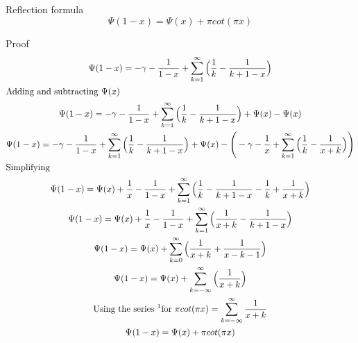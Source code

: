 \documentclass[a4paper]{article}
\begin{document}
    \begin{theorem}
        Reflection formula
        \begin{equation}
            \Psi(1-x) = \Psi(x) + \pi cot(\pi x) \label{gf:eq:equation13}
        \end{equation}

        Proof
        \begin{gather*}
            \Psi(1-x) = -\gamma - \frac{1}{1-x} + \sum_{k=1}^{\infty} \Big( \frac{1}{k} - \frac{1}{k+1-x}  \Big)
            \\
            \intertext{Adding and subtracting $\Psi(x)$}
            \Psi(1-x) = -\gamma - \frac{1}{1-x} + \sum_{k=1}^{\infty} \Big( \frac{1}{k} - \frac{1}{k+1-x}  \Big) + \Psi(x) - \Psi(x)
            \\
            \Psi(1-x) = -\gamma - \frac{1}{1-x} + \sum_{k=1}^{\infty} \Big( \frac{1}{k} - \frac{1}{k+1-x}  \Big) + \Psi(x) - \Bigg(-\gamma - \frac{1}{x} + \sum_{k=1}^{\infty} \Big( \frac{1}{k} - \frac{1}{x+k}  \Big) \Bigg)
            \\
            \intertext{Simplifying}
            \Psi(1-x) = \Psi(x) + \frac{1}{x} - \frac{1}{1-x} + \sum_{k=1}^{\infty} \Big( \frac{1}{k} - \frac{1}{k+1-x}  -  \frac{1}{k} + \frac{1}{x+k} \Big)
            \\
            \Psi(1-x) = \Psi(x) + \frac{1}{x} - \frac{1}{1-x} + \sum_{k=1}^{\infty} \Big(\frac{1}{x+k} - \frac{1}{k+1-x} \Big)
            \\
            \Psi(1-x) = \Psi(x) + \sum_{k=0}^{\infty} \Big(\frac{1}{x+k} + \frac{1}{x -k -1} \Big)
            \\
            \Psi(1-x) = \Psi(x) + \sum_{k=-\infty}^{\infty} \Big(\frac{1}{x+k} \Big)
            \\
            \text{Using the series \footnotemark for }\pi cot(\pi x) = \sum_{k=-\infty}^{\infty} \frac{1}{x + k}
            \\
            \Psi(1-x) = \Psi(x) + \pi cot(\pi x)
        \end{gather*}
    \end{theorem}

\end{document}
